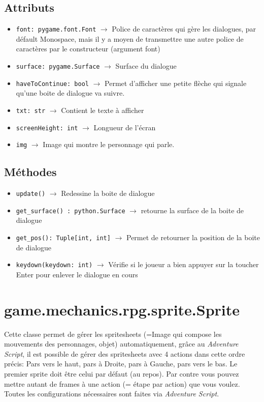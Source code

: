 \documentclass{report}
\begin{document}
\subsection*{Attributs}
\begin{itemize}
  \item \texttt{font: pygame.font.Font} $\rightarrow$ Police de caractères qui gère les dialogues, par défault Monospace, mais il y a moyen de transmettre une autre police de caractères par le constructeur (argument font)
  \item \texttt{surface: pygame.Surface} $\rightarrow$ Surface du dialogue

  \item \texttt{haveToContinue: bool} $\rightarrow$ Permet d'afficher une petite flèche qui signale qu'une boite de dialogue va suivre.

  \item \texttt{txt: str} $\rightarrow$ Contient le texte à afficher
  \item \texttt{screenHeight: int} $\rightarrow$ Longueur de l'écran
  \item \texttt{img} $\rightarrow$ Image qui montre le personnage qui parle.
\end{itemize}

\subsection*{Méthodes}
\begin{itemize}
  \item \texttt{update()} $\rightarrow$ Redessine la boite de dialogue
  \item \texttt{get_surface() : python.Surface} $\rightarrow$ retourne la surface de la boite de dialogue
  \item \texttt{get_pos(): Tuple[int, int]} $\rightarrow$ Permet de retourner la position de la boite de dialogue
  \item \texttt{keydown(keydown: int)} $\rightarrow$ Vérifie si le joueur a bien appuyer sur la toucher Enter pour enlever le dialogue en cours
\end{itemize}
\newpage
\section {game.mechanics.rpg.sprite.Sprite}
Cette classe permet de gérer les spritesheets (=Image qui compose les mouvements des personnages, objet) automatiquement, grâce au \emph{Adventure Script}, il est possible de gérer des spritesheets avec 4 actions dans cette ordre précis: Pars vers le haut, pars à Droite, pars à Gauche,  pars vers le bas. Le premier sprite doit être celui par défaut (au repos). Par contre vous pouvez mettre autant de frames à une action (= étape par action) que vous voulez. Toutes les configurations nécessaires sont faites via \emph{Adventure Script}.
\end{document}
